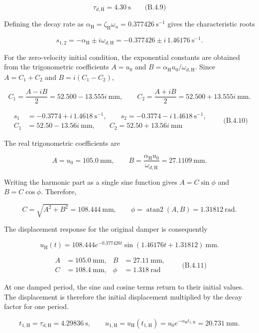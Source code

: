 \[
\boxed{\tau_{d,\mathrm{H}}=4.30\ \mathrm{s}}
\qquad\text{(B.4.9)}
\]

Defining the decay rate as $\alpha_{\mathrm{H}}=\zeta_{\mathrm{H}}\omega_n=0.377426\ \mathrm{s^{-1}}$ gives the characteristic roots

\[
s_{1,2}=-\alpha_{\mathrm{H}}\pm i\omega_{d,\mathrm{H}}
 =-0.377426\pm i\,1.46176\ \mathrm{s^{-1}}.
\]

For the zero-velocity initial condition, the exponential constants are obtained from the trigonometric coefficients $A=u_0$ and $B=\alpha_{\mathrm{H}}u_0/\omega_{d,\mathrm{H}}$. Since $A=C_1+C_2$ and $B=i(C_1-C_2)$,

\[
C_1=\frac{A-iB}{2}=52.500-13.555i\ \mathrm{mm},
\qquad
C_2=\frac{A+iB}{2}=52.500+13.555i\ \mathrm{mm}.
\]

\[
\boxed{
\begin{aligned}
s_1&=-0.3774+i\,1.4618\ \mathrm{s^{-1}},\qquad
s_2=-0.3774-i\,1.4618\ \mathrm{s^{-1}},\\
C_1&=52.50-13.56i\ \mathrm{mm},\qquad
C_2=52.50+13.56i\ \mathrm{mm}
\end{aligned}}
\qquad\text{(B.4.10)}
\]

The real trigonometric coefficients are

\[
A=u_0=105.0\ \mathrm{mm},
\qquad
B=\frac{\alpha_{\mathrm{H}}u_0}{\omega_{d,\mathrm{H}}}=27.1109\ \mathrm{mm}.
\]

Writing the harmonic part as a single sine function gives $A=C\sin\phi$ and $B=C\cos\phi$. Therefore,

\[
C=\sqrt{A^2+B^2}=108.444\ \mathrm{mm},
\qquad
\phi=\operatorname{atan2}(A,B)=1.31812\ \mathrm{rad}.
\]

The displacement response for the original damper is consequently

\[
u_{\mathrm{H}}(t)=108.444e^{-0.377426t}\sin(1.46176t+1.31812)\ \mathrm{mm}.
\]

\[
\boxed{
\begin{aligned}
A&=105.0\ \mathrm{mm},& B&=27.11\ \mathrm{mm},\\
C&=108.4\ \mathrm{mm},& \phi&=1.318\ \mathrm{rad}
\end{aligned}}
\qquad\text{(B.4.11)}
\]

At one damped period, the sine and cosine terms return to their initial values. The displacement is therefore the initial displacement multiplied by the decay factor for one period.

\[
t_{1,\mathrm{H}}=\tau_{d,\mathrm{H}}=4.29836\ \mathrm{s},
\qquad
u_{1,\mathrm{H}}=u_{\mathrm{H}}(t_{1,\mathrm{H}})
 =u_0e^{-\alpha_{\mathrm{H}}t_{1,\mathrm{H}}}=20.731\ \mathrm{mm}.
\]


